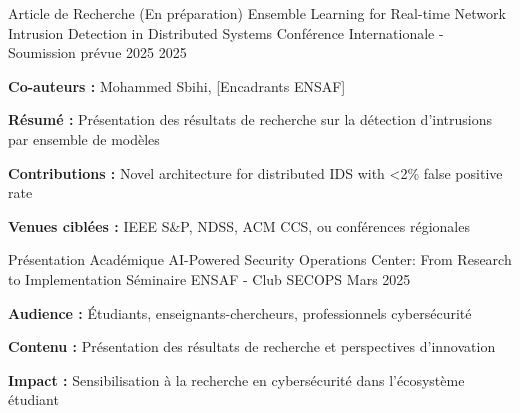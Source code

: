 
\begin{cventries}

    \cventry
    {Article de Recherche (En préparation)}
    {Ensemble Learning for Real-time Network Intrusion Detection in Distributed Systems} %
    {Conférence Internationale - Soumission prévue 2025} %
    {2025} %
    {
        \begin{cvitems} %
            \item {\textbf{Co-auteurs :} Mohammed Sbihi, [Encadrants ENSAF]}
            \item {\textbf{Résumé :} Présentation des résultats de recherche sur la détection d'intrusions par ensemble de modèles}
            \item {\textbf{Contributions :} Novel architecture for distributed IDS with <2\% false positive rate}
            \item {\textbf{Venues ciblées :} IEEE S\&P, NDSS, ACM CCS, ou conférences régionales}
        \end{cvitems}
    }

    \cventry
    {Présentation Académique}
    {AI-Powered Security Operations Center: From Research to Implementation} %
    {Séminaire ENSAF - Club SECOPS} %
    {Mars 2025} %
    {
        \begin{cvitems} %
            \item {\textbf{Audience :} Étudiants, enseignants-chercheurs, professionnels cybersécurité}
            \item {\textbf{Contenu :} Présentation des résultats de recherche et perspectives d'innovation}
            \item {\textbf{Impact :} Sensibilisation à la recherche en cybersécurité dans l'écosystème étudiant}
        \end{cvitems}
    }


\end{cventries}
